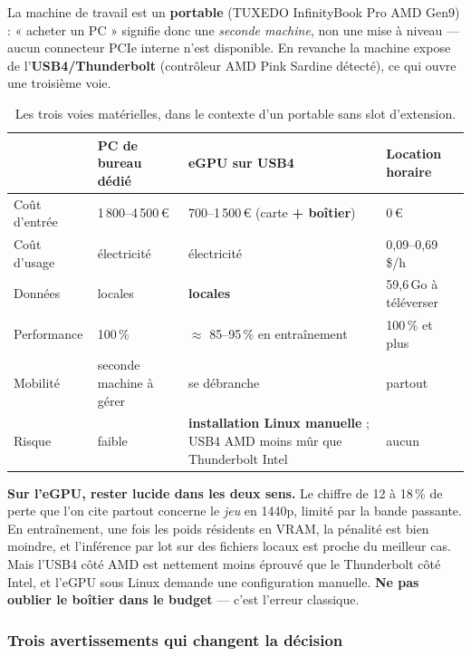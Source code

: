 \documentclass[11pt,a4paper]{article}
\newcommand{\alerte}[1]{\textcolor{alerte}{\textbf{#1}}}
\begin{document}
La machine de travail est un \textbf{portable} (TUXEDO InfinityBook Pro AMD
Gen9) : « acheter un PC » signifie donc une \emph{seconde machine}, non une mise
à niveau — aucun connecteur PCIe interne n'est disponible. En revanche la machine
expose de l'\textbf{USB4/Thunderbolt} (contrôleur AMD Pink Sardine détecté), ce
qui ouvre une troisième voie.

\begin{table}[h]
\centering
\small
\begin{tabularx}{\textwidth}{lYYY}
\toprule
 & \textbf{PC de bureau dédié} & \textbf{eGPU sur USB4} & \textbf{Location horaire} \\
\midrule
Coût d'entrée   & 1\,800--4\,500\,\euro{} & 700--1\,500\,\euro{} (carte \textbf{+ boîtier}) & 0\,\euro{} \\
\addlinespace
Coût d'usage    & électricité & électricité & 0,09--0,69 \$/h \\
\addlinespace
Données         & locales & \textbf{locales} & 59,6\,Go à téléverser \\
\addlinespace
Performance     & 100\,\% & $\approx$ 85--95\,\% en entraînement & 100\,\% et plus \\
\addlinespace
Mobilité        & seconde machine à gérer & se débranche & partout \\
\addlinespace
Risque          & faible & \textbf{installation Linux manuelle} ; USB4 AMD moins mûr que Thunderbolt Intel & aucun \\
\bottomrule
\end{tabularx}
\caption{Les trois voies matérielles, dans le contexte d'un portable sans slot
d'extension.}
\end{table}

\textbf{Sur l'eGPU, rester lucide dans les deux sens.} Le chiffre de 12 à 18\,\%
de perte que l'on cite partout concerne le \emph{jeu} en 1440p, limité par la
bande passante. En entraînement, une fois les poids résidents en VRAM, la
pénalité est bien moindre, et l'inférence par lot sur des fichiers locaux est
proche du meilleur cas. Mais l'USB4 côté AMD est nettement moins éprouvé que le
Thunderbolt côté Intel, et l'eGPU sous Linux demande une configuration manuelle.
\alerte{Ne pas oublier le boîtier dans le budget} — c'est l'erreur classique.

\subsubsection*{Trois avertissements qui changent la décision}
\end{document}

